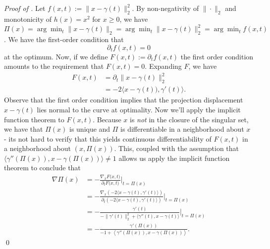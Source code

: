 \documentclass[11pt]{article}
\begin{document}
\noindent \textit{Proof of .} Let $f(x,t) := \|x - \gamma(t)\|_2^2$. By non-negativity of $\|\cdot\|_2$ and monotonicity of $h(x) = x^2$ for $x \geq 0$, we have $\Pi(x) = \arg\min_t \|x - \gamma(t)\|_2 = \arg \min_t \|x - \gamma(t)\|_2^2 = \arg\min_t f(x, t)$. We have the first-order condition that 
\[ \partial_t f(x,t) = 0\]
at the optimum. Now, if we define $F(x, t) := \partial_t f(x,t)$ the first order condition amounts to the requirement that $F(x,t) = 0$. Expanding $F$, we have
\begin{align}
    F(x, t) &= \partial_t \|x - \gamma(t)\|_2^2 \\ \label{eq: ift}
    &= -2\langle x - \gamma(t)), \gamma'(t)\rangle.
\end{align}
Observe that the first order condition implies that the projection displacement $x - \gamma(t)$ lies normal to the curve at optimality. 
Now we'll apply the implicit function theorem to $F(x, t)$. Because $x$ is \textit{not} in the closure of the singular set, we have that $\Pi(x)$ is unique and $\Pi$ is differentiable in a neighborhood about $x$ - its not hard to verify that this yields continuous differentiability of $F(x,t)$ in a neighborhood about $(x, \Pi(x))$. This, coupled with the assumption that $\langle\gamma''(\Pi(x)), x - \gamma(\Pi(x))\rangle \neq 1$ allows us apply the implicit function theorem to conclude that 
\begin{align}
    \nabla\Pi(x) &= - \frac{\nabla_x F\big(x, t\big)}{\partial_t F\big(x, t\big)} \Bigg|_{t = \Pi(x)}\\
    &= - \frac{\nabla_x\left(-2\langle x - \gamma(t), \gamma'(t)\rangle\right)}{\partial_t \left(-2\langle x - \gamma(t), \gamma'(t)\rangle\right)} \Bigg|_{t = \Pi(x)}\\
    &= -\frac{\gamma'(t)}{-\|\gamma'(t)\|_2^2 + 
    \langle\gamma''(t), x - \gamma(t)\rangle}\Bigg|_{t = \Pi(x)} \label{eq: projection grad} \\ 
    &= -\frac{\gamma'(\Pi(x))}{-1 + \left\langle\gamma''(\Pi(x)), x - \gamma(\Pi(x))\right\rangle}.
\end{align}
\qed{}
\end{document}
